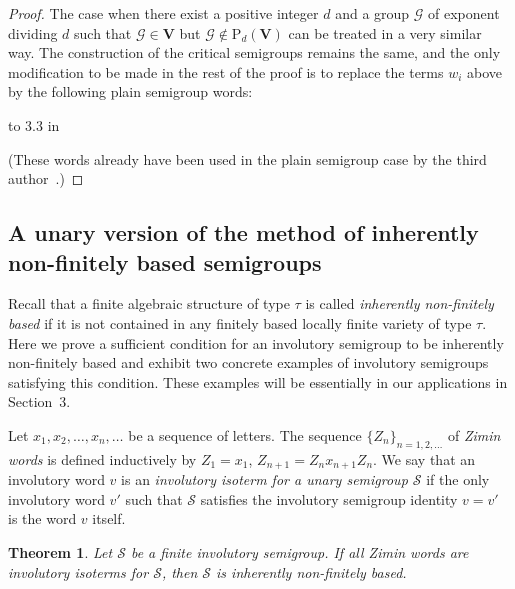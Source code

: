 \documentclass[11pt,reqno]{amsart}
\numberwithin{equation}{section}
\newtheorem{Thm}{Theorem}[section]
\theoremstyle{remark}
\def\Vc{\mathbf{V}}
\def\P{\mathrm P\!}
\begin{document}
\begin{proof}
\smallskip

The case when there exist a positive integer $d$ and a group
$\mathcal{G}$ of exponent dividing $d$ such that
$\mathcal{G}\in\Vc$ but $\mathcal{G}\notin\P_d(\Vc)$ can be
treated in a very similar way. The construction of the critical
semigroups remains the same, and the only modification to be made
in the rest of the proof is to replace the terms $w_i$ above by
the following plain semigroup words:

\smallskip

 

\hbox to 3.3 in {\dotfill }


\smallskip

\noindent (These words already have been used in the plain
semigroup case by the third author~\cite{V}.)
\end{proof}

\subsection{A unary version of the method of inherently
non-finitely based semigroups} Recall that a finite algebraic
structure of type $\tau$ is called \emph{inherently non-finitely
based} if it is not contained in any finitely based locally finite
variety of type $\tau$. Here we prove a sufficient condition for
an involutory semigroup to be inherently non-finitely based and
exhibit two concrete examples of involutory semigroups satisfying
this condition. These examples will be essentially in our
applications in Section~3.

Let $x_1,x_2,\dots,x_n,\dots$ be a sequence of letters. The
sequence $\{Z_n\}_{n=1,2,\dots}$ of \emph{Zimin words} is defined
inductively by $Z_1=x_1$, $Z_{n+1}=Z_nx_{n+1}Z_n$. We say that an
involutory word $v$ is an \emph{involutory isoterm for a unary
semigroup $\mathcal{S}$} if the only involutory word $v'$ such
that $\mathcal{S}$ satisfies the involutory semigroup identity
$v=v'$ is the word $v$ itself.

\begin{Thm}
\label{Theorem 2.2} Let $\mathcal{S}$ be a finite involutory
semigroup. If all Zimin words are involutory isoterms for
$\mathcal{S}$, then $\mathcal{S}$ is inherently non-finitely
based.
\end{Thm}
\end{document}
